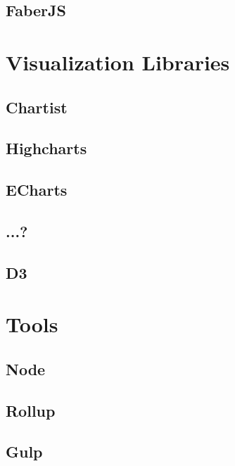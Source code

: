 \subsection{FaberJS}

\section{Visualization Libraries}

\subsection{Chartist}
\subsection{Highcharts}
\subsection{ECharts}
\subsection{...?}
\subsection{D3}

\section{Tools}
\subsection{Node}
\subsection{Rollup}
\subsection{Gulp}

